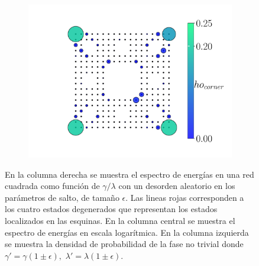 \begin{figure}[tbh!]
\begin{minipage}[h!]{0.9\textwidth}
\begin{subfigure}[b!]{0.3 \textwidth}
         \end{subfigure}\hspace*{-0.5em}
         \begin{subfigure}[b!]{0.4 \textwidth}
             \caption*{}
             \includegraphics[width=\textwidth]{Imagenes/Resultados_Hoti_Fractal/proyection_square_0.5.pdf}
         \end{subfigure}\hspace*{-0.5em}
     \end{minipage}
     
     
    \caption{En la columna derecha se muestra el espectro de energías en una red cuadrada como función de $\gamma/\lambda $ con un desorden aleatorio en los parámetros de salto, de tamaño $\epsilon$. Las lineas rojas corresponden a los cuatro estados degenerados que representan los estados localizados en las esquinas. En la columna central se muestra el espectro de energías en escala logarítmica. En la columna izquierda se muestra la densidad de probabilidad de la fase no trivial donde $\gamma' = \gamma( 1 \pm \epsilon) ,\, \, \lambda' = \lambda( 1 \pm \epsilon)$.  }
    \label{fig:para_proy_Delta_fractal}
\end{figure}

